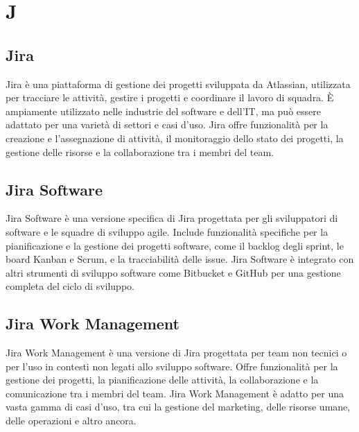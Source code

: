 \section{J}

\vspace{2em}
\subsection*{Jira}
Jira è una piattaforma di gestione dei progetti sviluppata da Atlassian, utilizzata per tracciare le attività, gestire i progetti e coordinare il lavoro di squadra. È ampiamente utilizzato nelle industrie del software e dell'IT, ma può essere adattato per una varietà di settori e casi d'uso. Jira offre funzionalità per la creazione e l'assegnazione di attività, il monitoraggio dello stato dei progetti, la gestione delle risorse e la collaborazione tra i membri del team.

\vspace{2em}
\subsection*{Jira Software}
Jira Software è una versione specifica di Jira progettata per gli sviluppatori di software e le squadre di sviluppo agile. Include funzionalità specifiche per la pianificazione e la gestione dei progetti software, come il backlog degli sprint, le board Kanban e Scrum, e la tracciabilità delle issue. Jira Software è integrato con altri strumenti di sviluppo software come Bitbucket e GitHub per una gestione completa del ciclo di sviluppo.

\vspace{2em}
\subsection*{Jira Work Management}
Jira Work Management è una versione di Jira progettata per team non tecnici o per l'uso in contesti non legati allo sviluppo software. Offre funzionalità per la gestione dei progetti, la pianificazione delle attività, la collaborazione e la comunicazione tra i membri del team. Jira Work Management è adatto per una vasta gamma di casi d'uso, tra cui la gestione del marketing, delle risorse umane, delle operazioni e altro ancora.
